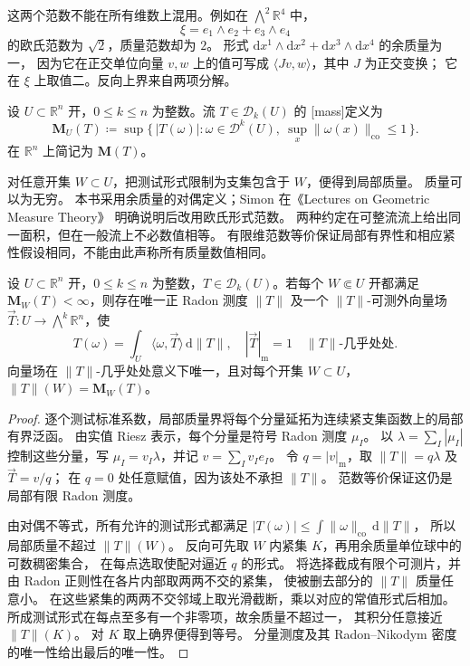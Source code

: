 这两个范数不能在所有维数上混用。例如在 \(\bigwedge^2\mathbb R^4\) 中，
\[
 \xi=e_1\wedge e_2+e_3\wedge e_4
\]
的欧氏范数为 \(\sqrt2\)，质量范数却为 \(2\)。
形式 \(\mathrm{d}x^1\wedge \mathrm{d}x^2+\mathrm{d}x^3\wedge \mathrm{d}x^4\) 的余质量为一，
因为它在正交单位向量 \(v,w\) 上的值可写成 \(\langle Jv,w\rangle\)，其中 \(J\) 为正交变换；
它在 \(\xi\) 上取值二。反向上界来自两项分解。

\begin{definition}\label{b1:def:app-d-current-mass}
设 \(U\subset\mathbb R^n\) 开，\(0\le k\le n\) 为整数。流 \(T\in\mathcal D_k(U)\) 的%
[mass]定义为
\[
 \mathbf M_U(T)\coloneqq
 \sup\{\,|T(\omega)|:\omega\in\mathcal D^k(U),\
                           \sup_x\|\omega(x)\|_{\mathrm{co}}\leq1\,\}.
\]
在 \(\mathbb R^n\) 上简记为 \(\mathbf M(T)\)。
\end{definition}

对任意开集 \(W\subset U\)，把测试形式限制为支集包含于 \(W\)，便得到局部质量。
质量可以为无穷。
本书采用余质量的对偶定义；Simon 在《Lectures on Geometric Measure Theory》%
\cite[26.6 REMARK]{Simon1983Lectures}明确说明后改用欧氏形式范数。
两种约定在可整流流上给出同一面积，但在一般流上不必数值相等。
有限维范数等价保证局部有界性和相应紧性假设相同，不能由此声称所有质量数值相同。

\begin{proposition}\label{b1:prop:app-d-mass-representation}
设 \(U\subset\mathbb R^n\) 开，\(0\le k\le n\) 为整数，\(T\in\mathcal D_k(U)\)。若每个 \(W\Subset U\) 开都满足 \(\mathbf M_W(T)<\infty\)，则存在唯一正 Radon 测度 \(\|T\|\)
及一个 \(\|T\|\)-可测外向量场 \(\vec T:U\to\bigwedge^k\mathbb R^n\)，使
\[
 T(\omega)=\int_U\langle\omega,\vec T\rangle\,\mathrm{d}\|T\|,
 \quad |\vec T|_{\mathrm m}=1\quad\|T\|\text{-几乎处处}.
\]
向量场在 \(\|T\|\)-几乎处处意义下唯一，且对每个开集 \(W\subset U\)，
\(\|T\|(W)=\mathbf M_W(T)\)。
\end{proposition}
\begin{proof}
逐个测试标准系数，局部质量界将每个分量延拓为连续紧支集函数上的局部有界泛函。
由实值 Riesz 表示，每个分量是符号 Radon 测度 \(\mu_I\)。
以 \(\lambda=\sum_I|\mu_I|\) 控制这些分量，写
\(\mu_I=v_I\lambda\)，并记 \(v=\sum_Iv_Ie_I\)。
令 \(q=|v|_{\mathrm m}\)，取 \(\|T\|=q\lambda\) 及 \(\vec T=v/q\)；
在 \(q=0\) 处任意赋值，因为该处不承担 \(\|T\|\)。
范数等价保证这仍是局部有限 Radon 测度。

由对偶不等式，所有允许的测试形式都满足
\(|T(\omega)|\leq\int\|\omega\|_{\mathrm{co}}\,\mathrm{d}\|T\|\)，
所以局部质量不超过 \(\|T\|(W)\)。
反向可先取 \(W\) 内紧集 \(K\)，再用余质量单位球中的可数稠密集合，
在每点选取使配对逼近 \(q\) 的形式。
将选择截成有限个可测片，并由 Radon 正则性在各片内部取两两不交的紧集，
使被删去部分的 \(\|T\|\) 质量任意小。
在这些紧集的两两不交邻域上取光滑截断，乘以对应的常值形式后相加。
所成测试形式在每点至多有一个非零项，故余质量不超过一，
其积分任意接近 \(\|T\|(K)\)。
对 \(K\) 取上确界便得到等号。
分量测度及其 Radon--Nikodym 密度的唯一性给出最后的唯一性。
\end{proof}

